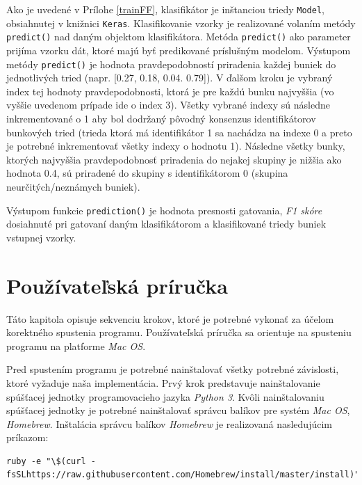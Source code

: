 Ako je uvedené v Prílohe \ref{trainFF}, klasifikátor je inštanciou triedy \texttt{Model}, obsiahnutej v knižnici \texttt{Keras}. Klasifikovanie vzorky je realizované volaním metódy \texttt{predict()} nad daným objektom klasifikátora. Metóda \texttt{predict()} ako parameter prijíma vzorku dát, ktoré majú byť predikované príslušným modelom. Výstupom metódy \texttt{predict()} je hodnota pravdepodobností priradenia každej buniek do jednotlivých tried (napr. [0.27, 0.18, 0.04. 0.79]). V ďalšom kroku je vybraný index tej hodnoty pravdepodobnosti, ktorá je pre každú bunku najvyššia (vo vyššie uvedenom prípade ide o index 3). Všetky vybrané indexy sú následne inkrementované o 1 aby bol dodržaný pôvodný konsenzus identifikátorov bunkových tried (trieda ktorá má identifikátor 1 sa nachádza na indexe 0 a preto je potrebné inkrementovať všetky indexy o hodnotu 1). Následne všetky bunky, ktorých najvyššia pravdepodobnosť priradenia do nejakej skupiny je nižšia ako hodnota 0.4, sú priradené do skupiny s identifikátorom 0 (skupina neurčitých/neznámych buniek).

Výstupom funkcie \texttt{prediction()} je hodnota presnosti gatovania, \textit{F1 skóre} dosiahnuté pri gatovaní daným klasifikátorom a klasifikované triedy buniek vstupnej vzorky.

\chapter{Používateľská príručka}

Táto kapitola opisuje sekvenciu krokov, ktoré je potrebné vykonať za účelom korektného spustenia programu. Používateľská príručka sa orientuje na spusteniu programu na platforme \textit{Mac OS}.

Pred spustením programu je potrebné nainštalovať všetky potrebné závislosti, ktoré vyžaduje naša implementácia. Prvý krok predstavuje nainštalovanie spúšťacej jednotky programovacieho jazyka \textit{Python 3}. Kvôli nainštalovaniu spúšťacej jednotky je potrebné nainštalovať správcu balíkov pre systém \textit{Mac OS}, \textit{Homebrew}. Inštalácia správcu balíkov \textit{Homebrew} je realizovaná nasledujúcim príkazom:

\begin{Verbatim}[breaklines=true, breakanywhere=true]
ruby -e "\$(curl -fsSLhttps://raw.githubusercontent.com/Homebrew/install/master/install)"
\end{Verbatim}

